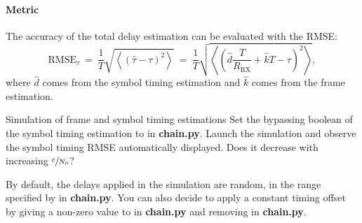 \paragraph{Metric} The accuracy of the total delay estimation can be evaluated with the RMSE:
\begin{equation*}
    \text{RMSE}_{\tau}\:=\:\frac{1}{T}\sqrt{\left\langle\left(\hat{\tau}-\tau\right)^2\right\rangle}\:=\:\frac{1}{T}\sqrt{\left\langle\left(\hat{d}\frac{T}{R_{\text{RX}}}+\hat{k}T-\tau\right)^2\right\rangle},
\end{equation*}
where $\hat{d}$ comes from the symbol timing estimation and $\hat{k}$ comes from the frame estimation.



\begin{bclogo}[couleur = gray!20, arrondi = 0.2, logo=\bccrayon]{Simulation of frame and symbol timing estimations}
Set the bypassing boolean of the symbol timing estimation to  in \textbf{chain.py}. Launch the simulation and observe the symbol timing RMSE automatically displayed. Does it decrease with increasing $\sfrac{\varepsilon}{N_0}$?

By default, the delays applied in the simulation are random, in the range specified by  in \textbf{chain.py}. You can also decide to apply a constant timing offset by giving a non-zero value to  in \textbf{chain.py} and removing  in \textbf{chain.py}.

\end{bclogo}
